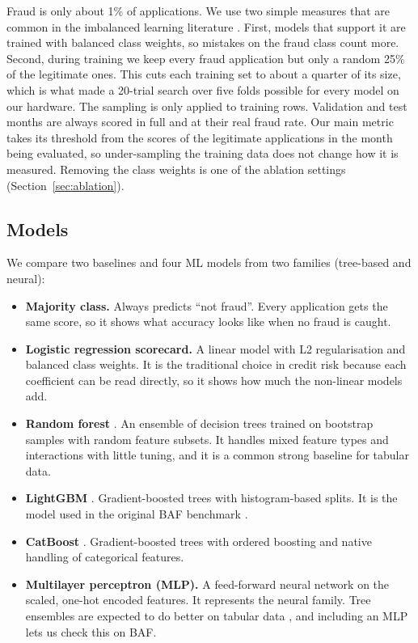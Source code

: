 Fraud is only about 1\% of applications. We use two simple measures that are common in the
imbalanced learning literature \cite{johnson2019survey}. First, models that support it are trained
with balanced class weights, so mistakes on the fraud class count more. Second, during training we
keep every fraud application but only a random 25\% of the legitimate ones. This cuts each training
set to about a quarter of its size, which is what made a 20-trial search over five folds possible for
every model on our hardware. The sampling is only applied to training rows. Validation and test
months are always scored in full and at their real fraud rate. Our main metric takes its threshold
from the scores of the legitimate applications in the month being evaluated, so under-sampling the
training data does not change how it is measured. Removing the class weights is one of the ablation
settings (Section~\ref{sec:ablation}).

\subsection{Models}
\label{sec:method-models}

We compare two baselines and four ML models from two families (tree-based and neural):
\begin{itemize}
  \item \textbf{Majority class.} Always predicts ``not fraud''. Every application gets the same
        score, so it shows what accuracy looks like when no fraud is caught.
  \item \textbf{Logistic regression scorecard.} A linear model with L2 regularisation and balanced
        class weights. It is the traditional choice in credit risk because each coefficient can be
        read directly, so it shows how much the non-linear models add.
  \item \textbf{Random forest} \cite{breiman2001random}. An ensemble of decision trees trained on
        bootstrap samples with random feature subsets. It handles mixed feature types and
        interactions with little tuning, and it is a common strong baseline for tabular data.
  \item \textbf{LightGBM} \cite{ke2017lightgbm}. Gradient-boosted trees with histogram-based
        splits. It is the model used in the original BAF benchmark \cite{jesus2022turning}.
  \item \textbf{CatBoost} \cite{prokhorenkova2018catboost}. Gradient-boosted trees with ordered
        boosting and native handling of categorical features.
  \item \textbf{Multilayer perceptron (MLP).} A feed-forward neural network on the scaled, one-hot
        encoded features. It represents the neural family. Tree ensembles are expected to do better
        on tabular data \cite{grinsztajn2022tree, shwartzziv2022tabular}, and including an MLP lets
        us check this on BAF.
\end{itemize}

